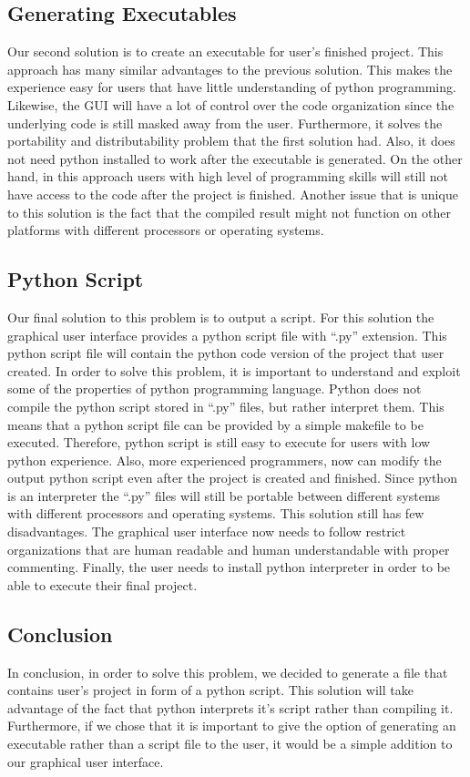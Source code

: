\documentclass[journal,10pt,onecolumn,compsoc]{IEEEtran} \usepackage[margin=1.0in]{geometry} \usepackage{pdfpages} \usepackage{graphicx}
\begin{document}
\subsection{Generating Executables}
Our second solution is to create an executable for user’s finished project. 
This approach has many similar advantages to the previous solution. 
This makes the experience easy for users that have little understanding of python programming. 
Likewise, the GUI will have a lot of control over the code organization since the underlying code is still masked away from the user. 
Furthermore, it solves the portability and distributability problem that the first solution had. 
Also, it does not need python installed to work after the executable is generated. 
On the other hand, in this approach users with high level of programming skills will still not have access to the code after the project is finished. 
Another issue that is unique to this solution is the fact that the compiled result might not function on other platforms with different processors or operating systems.

\subsection{Python Script}
Our final solution to this problem is to output a script. 
For this solution the graphical user interface provides a python script file with “.py” extension. 
This python script file will contain the python code version of the project that user created. 
In order to solve this problem, it is important to understand and exploit some of the properties of python programming language. 
Python does not compile the python script stored in “.py” files, but rather interpret them. 
This means that a python script file can be provided by a simple makefile to be executed. 
Therefore, python script is still easy to execute for users with low python experience. 
Also, more experienced programmers, now can modify the output python script even after the project is created and finished. 
Since python is an interpreter the “.py” files will still be portable between different systems with different processors and operating systems. 
This solution still has few disadvantages. 
The graphical user interface now needs to follow restrict organizations that are human readable and human understandable with proper commenting. 
Finally, the user needs to install python interpreter in order to be able to execute their final project.

\subsection{Conclusion}
In conclusion, in order to solve this problem, we decided to generate a file that contains user’s project in form of a python script. 
This solution will take advantage of the fact that python interprets it’s script rather than compiling it. Furthermore, if we chose that it is important to give the option of generating an executable rather than a script file to the user, it would be a simple addition to our graphical user interface.
\end{document}
